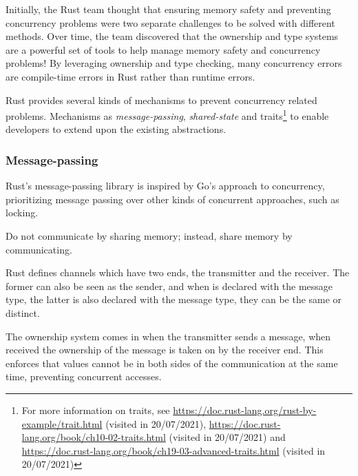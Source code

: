 \begin{displayquote}
    Initially, the Rust team thought that ensuring memory safety and preventing concurrency problems were two separate challenges to be solved with different methods.
    Over time, the team discovered that the ownership and type systems are a powerful set of tools to help manage memory safety and concurrency problems!
    By leveraging ownership and type checking, many concurrency errors are compile-time errors in Rust rather than runtime errors.
\end{displayquote}

Rust provides several kinds of mechanisms to prevent concurrency related problems.
Mechanisms as \emph{message-passing}, \emph{shared-state} and
traits\footnote{For more information on traits, see \url{https://doc.rust-lang.org/rust-by-example/trait.html} (visited in 20/07/2021),
\url{https://doc.rust-lang.org/book/ch10-02-traits.html} (visited in 20/07/2021) and \url{https://doc.rust-lang.org/book/ch19-03-advanced-traits.html} (visited in 20/07/2021)} to enable developers to extend upon the existing abstractions.

\subsubsection*{Message-passing}

Rust's message-passing library is inspired by Go's approach to concurrency,
prioritizing message passing over other kinds of concurrent approaches, such as locking.

\begin{displayquote}
    Do not communicate by sharing memory; instead, share memory by communicating.
\end{displayquote}

Rust defines channels which have two ends, the transmitter and the receiver.
The former can also be seen as the sender, and when is declared with the message type,
the latter is also declared with the message type, they can be the same or distinct.

The ownership system comes in when the transmitter sends a message,
when received the ownership of the message is taken on by the receiver end.
This enforces that values cannot be in both sides of the communication at the same time,
preventing concurrent accesses.

